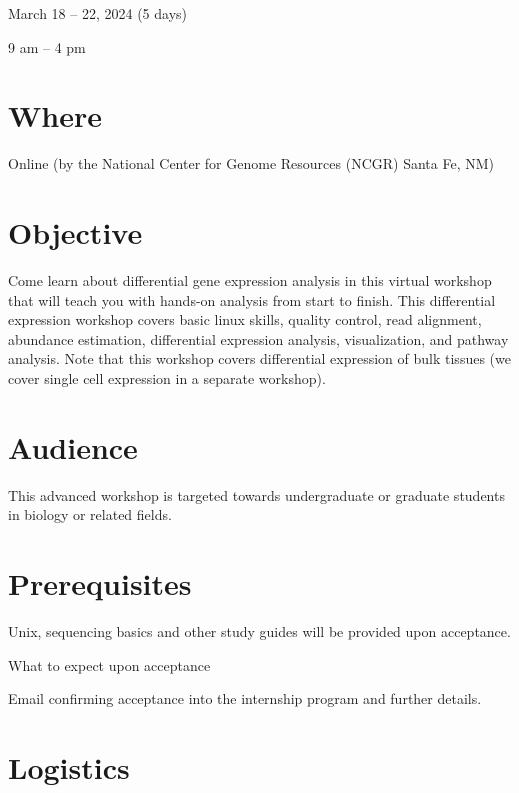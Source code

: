 \documentclass[
]{book}
\begin{document}
March 18 -- 22, 2024 (5 days)

9 am -- 4 pm

\hypertarget{where-3}{%
\section*{Where}\label{where-3}}

Online (by the National Center for Genome Resources (NCGR) Santa Fe, NM)

\hypertarget{objective-3}{%
\section*{Objective}\label{objective-3}}

Come learn about differential gene expression analysis in this virtual workshop that will teach you with hands-on analysis from start to finish. This differential expression workshop covers basic linux skills, quality control, read alignment, abundance estimation, differential expression analysis, visualization, and pathway analysis. Note that this workshop covers differential expression of bulk tissues (we cover single cell expression in a separate workshop).

\hypertarget{audience-3}{%
\section*{Audience}\label{audience-3}}

This advanced workshop is targeted towards undergraduate or graduate students in biology or related fields.

\hypertarget{prerequisites-3}{%
\section*{Prerequisites}\label{prerequisites-3}}

Unix, sequencing basics and other study guides will be provided upon acceptance.

What to expect upon acceptance

Email confirming acceptance into the internship program and further details.

\hypertarget{logistics-3}{%
\section*{Logistics}\label{logistics-3}}
\end{document}
